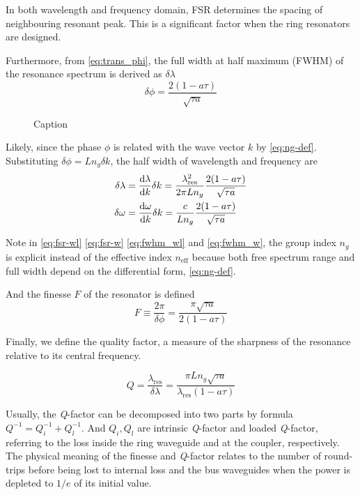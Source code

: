 \documentclass[final]{kuee_en}
\begin{document}
In both wavelength and frequency domain, FSR determines the spacing of neighbouring resonant peak. This is a significant factor when the ring resonators are designed.

Furthermore, from \autoref{eq:trans_phi}, the full width at half maximum (FWHM) of the resonance spectrum is derived as $\delta\lambda$
\begin{equation}\label{eq:fwhm_phi}
    \delta\phi = \frac{2(1- a \tau)}{\sqrt{\tau a}}
\end{equation}
\begin{figure}
    \centering
    
    \caption{Caption}
    \label{fig:my_label}
\end{figure}
Likely, since the phase $\phi$ is related with the wave vector $k$ by \autoref{eq:ng-def}. Substituting $\delta \phi = L n_g \delta k$, the half width of wavelength and frequency are
\begin{align}
    \delta \lambda &= \dv{\lambda}{k}\delta k = \frac{\lambda_\mathrm{res}^2}{2\pi L n_g} \frac{2(1- a \tau)}{\sqrt{\tau a}} \label{eq:fwhm_wl}\\
    \delta \omega &= \dv{\omega}{k}\delta k = \frac{c}{ L n_g} \frac{2(1- a \tau)}{\sqrt{\tau a}} \label{eq:fwhm_w}
\end{align}

Note in \autoref{eq:fsr-wl} \autoref{eq:fsr-w} \autoref{eq:fwhm_wl} and \autoref{eq:fwhm_w}, the group index $n_g$ is explicit instead of the effective index $n_\mathrm{eff}$ because both free spectrum range and full width depend on the differential form, \autoref{eq:ng-def}.

And the finesse $F$ of the resonator is defined 
\begin{equation}
    F \equiv \frac{2\pi}{\delta\phi} = \frac{\pi\sqrt{\tau a}}{2(1- a \tau)}
\end{equation}

Finally, we define the quality factor, a measure of the sharpness of the resonance relative to its central frequency.

\begin{equation}\label{eq:q-def}
    Q = \frac{\lambda_\mathrm{res}}{\delta \lambda} =  \frac{\pi L n_g \sqrt{\tau a}} {\lambda_\mathrm{res} (1- a \tau)}
\end{equation}

Usually, the \textit{Q}-factor can be decomposed into two parts by formula $Q^{-1}=Q_{i}^{-1} + Q_{l}^{-1}$. And $Q_{i}, Q_{l}$ are intrinsic \textit{Q}-factor and loaded \textit{Q}-factor, referring to the loss inside the ring waveguide and at the coupler, respectively. The physical meaning of the finesse and \textit{Q}-factor relates to the number of round-trips before being lost to internal loss and the bus waveguides when the power is depleted to $1/e$ of its initial value.
\end{document}
